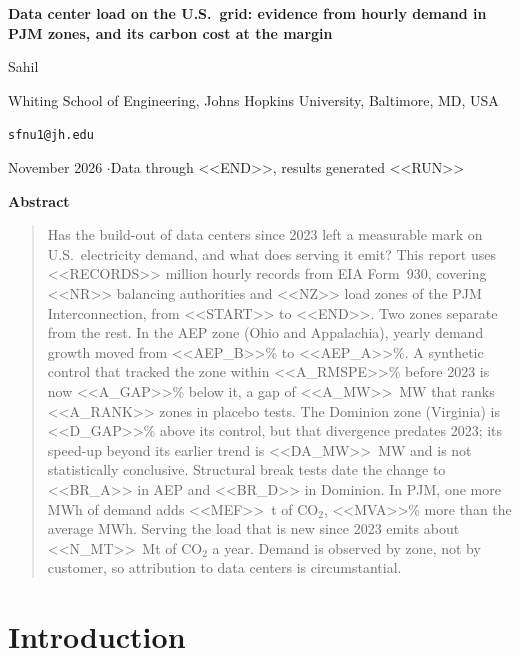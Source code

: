 \documentclass[11pt,a4paper]{article}
\begin{document}
\begin{center}
{\LARGE\bfseries Data center load on the U.S.\ grid: evidence from hourly demand in PJM zones, and its carbon cost at the margin\par}
\vspace{1.1em}
{\large Sahil\par}
\vspace{0.3em}
{\small Whiting School of Engineering, Johns Hopkins University, Baltimore, MD, USA\par}
{\small\texttt{sfnu1@jh.edu}\par}
\vspace{0.8em}
{\small November 2026 \quad$\cdot$\quad Data through <<END>>, results generated <<RUN>>\par}
\end{center}

\vspace{0.6em}
\begin{center}\textbf{Abstract}\end{center}
\begin{quote}\small
Has the build-out of data centers since 2023 left a measurable mark on U.S.\ electricity demand, and what does serving it emit? This report uses <<RECORDS>> million hourly records from EIA Form~930, covering <<NR>> balancing authorities and <<NZ>> load zones of the PJM Interconnection, from <<START>> to <<END>>. Two zones separate from the rest. In the AEP zone (Ohio and Appalachia), yearly demand growth moved from <<AEP_B>>\% to <<AEP_A>>\%. A synthetic control that tracked the zone within <<A_RMSPE>>\% before 2023 is now <<A_GAP>>\% below it, a gap of <<A_MW>>~MW that ranks <<A_RANK>> zones in placebo tests. The Dominion zone (Virginia) is <<D_GAP>>\% above its control, but that divergence predates 2023; its speed-up beyond its earlier trend is <<DA_MW>>~MW and is not statistically conclusive. Structural break tests date the change to <<BR_A>> in AEP and <<BR_D>> in Dominion. In PJM, one more MWh of demand adds <<MEF>>~t of CO$_2$, <<MVA>>\% more than the average MWh. Serving the load that is new since 2023 emits about <<N_MT>>~Mt of CO$_2$ a year. Demand is observed by zone, not by customer, so attribution to data centers is circumstantial.
\end{quote}

\section{Introduction}
\end{document}
